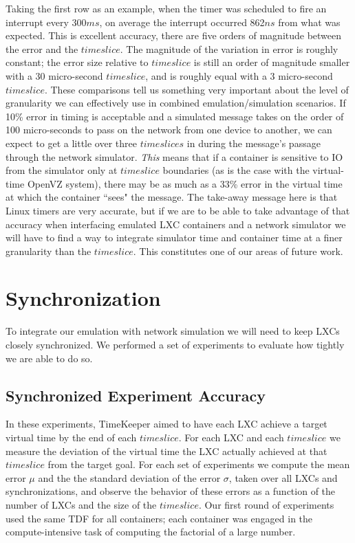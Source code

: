 Taking the first row as an example, when the timer was scheduled to fire an interrupt every 300$ms$, on average the interrupt occurred 862$ns$ from what was expected.  This is excellent accuracy, there are five orders of magnitude between the error and the $timeslice$. The magnitude of the variation in error is roughly constant; the error size relative to $timeslice$ is still an order of magnitude smaller with a 30 micro-second $timeslice$, and is roughly equal with a 3 micro-second $timeslice$.  These comparisons tell us something very important about the level of granularity we can effectively use in combined emulation/simulation scenarios.  If 10\% error in timing is acceptable and a simulated message takes on the order of 100 micro-seconds to pass on the network from one device to 
another, we can expect to get a little over three $timeslices$ in during the message's passage 
through the network simulator. {\em This} means that if a container is sensitive to IO from the simulator only at $timeslice$ boundaries (as is the case with the virtual-time OpenVZ system), there may be as much as a 33\% error in the virtual time at which the container ``sees" the message.    The take-away message here is that Linux timers are very accurate, but if we are to be able to take advantage of that accuracy when interfacing emulated LXC containers and a network simulator we will have to find a way to integrate simulator time and container time at a finer granularity than the $timeslice$.  This constitutes one of our areas of future work.

\section{Synchronization}
To integrate our emulation with network simulation we will need to keep LXCs closely synchronized.  We performed a set of experiments to evaluate how tightly we are able to do so. 
\subsection{Synchronized Experiment Accuracy}
In these experiments, TimeKeeper aimed to have each LXC achieve a target virtual time by the end of each $timeslice$. For each LXC and each $timeslice$ we measure the deviation of the virtual time the LXC actually achieved at that $timeslice$ from the target goal.  For each set of experiments we compute the mean error $\mu$ and the the standard deviation of the error $\sigma$, taken over all LXCs and synchronizations, and observe the behavior of these errors as a function of the number of LXCs and the size of the $timeslice$.  Our first round of experiments used the same TDF for all containers; 
each container was engaged in the compute-intensive task of computing the factorial of a large number.

